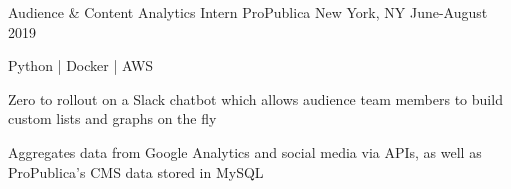 \begin{cventries}
  \cventry
    {Audience \& Content Analytics Intern}
    {ProPublica}
    {New York, NY}
    {June-August 2019}
    {
      \begin{cvitems}
        \item {Python | Docker | AWS}
        \item {
          Zero to rollout on a Slack chatbot which allows audience team
          members to build custom lists and graphs on the fly
        }
        \item {
          Aggregates data from Google Analytics and social media via APIs, as well
          as ProPublica's CMS data stored in MySQL
        }
      \end{cvitems}
    }

\end{cventries}
